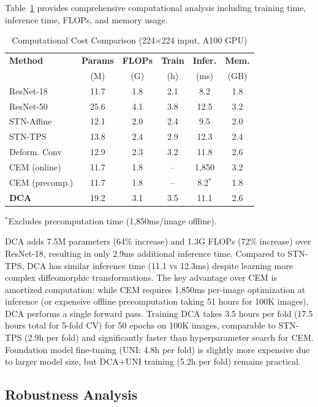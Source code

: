 \documentclass[10pt,journal,compsoc]{IEEEtran}
\begin{document}
Table~\ref{tab:computational} provides comprehensive computational analysis including training time, inference time, FLOPs, and memory usage.

\begin{table}[t]
\centering
\caption{Computational Cost Comparison (224$\times$224 input, A100 GPU)}
\label{tab:computational}
\setlength{\tabcolsep}{2.5pt}
\begin{tabular}{lccccc}
\hline
\textbf{Method} & \textbf{Params} & \textbf{FLOPs} & \textbf{Train} & \textbf{Infer.} & \textbf{Mem.} \\
 & (M) & (G) & (h) & (ms) & (GB) \\
\hline
ResNet-18 & 11.7 & 1.8 & 2.1 & 8.2 & 1.8 \\
ResNet-50 & 25.6 & 4.1 & 3.8 & 12.5 & 3.2 \\
STN-Affine & 12.1 & 2.0 & 2.4 & 9.5 & 2.0 \\
STN-TPS & 13.8 & 2.4 & 2.9 & 12.3 & 2.4 \\
Deform. Conv & 12.9 & 2.3 & 3.2 & 11.8 & 2.6 \\
CEM (online) & 11.7 & 1.8 & -- & 1,850 & 3.2 \\
CEM (precomp.) & 11.7 & 1.8 & -- & 8.2$^*$ & 1.8 \\
\textbf{DCA} & 19.2 & 3.1 & 3.5 & 11.1 & 2.6 \\
\hline
\end{tabular}

\vspace{1mm}
\footnotesize{$^*$Excludes precomputation time (1,850ms/image offline).}
\end{table}

DCA adds 7.5M parameters (64\% increase) and 1.3G FLOPs (72\% increase) over ResNet-18, resulting in only 2.9ms additional inference time. Compared to STN-TPS, DCA has similar inference time (11.1 vs 12.3ms) despite learning more complex diffeomorphic transformations. The key advantage over CEM is amortized computation: while CEM requires 1,850ms per-image optimization at inference (or expensive offline precomputation taking 51 hours for 100K images), DCA performs a single forward pass. Training DCA takes 3.5 hours per fold (17.5 hours total for 5-fold CV) for 50 epochs on 100K images, comparable to STN-TPS (2.9h per fold) and significantly faster than hyperparameter search for CEM. Foundation model fine-tuning (UNI: 4.8h per fold) is slightly more expensive due to larger model size, but DCA+UNI training (5.2h per fold) remains practical.

\subsection{Robustness Analysis}
\end{document}
